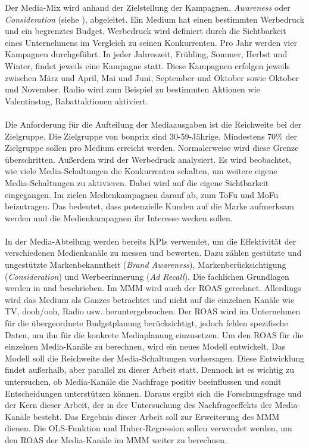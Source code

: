 Der Media-Mix wird anhand der Zielstellung der Kampagnen, \textit{Awareness} oder \textit{Consideration} (siehe ), abgeleitet. Ein Medium hat einen bestimmten Werbedruck und ein begrenztes Budget. Werbedruck wird definiert durch die Sichtbarkeit eines Unternehmens im Vergleich zu seinen Konkurrenten. Pro Jahr werden vier Kampagnen durchgeführt. In jeder Jahreszeit, Frühling, Sommer, Herbst und Winter, findet jeweils eine Kampagne statt. Diese Kampagnen erfolgen jeweils zwischen März und April, Mai und Juni, September und Oktober sowie Oktober und November. Radio wird zum Beispiel zu bestimmten Aktionen wie Valentinstag, Rabattaktionen aktiviert.\\\\
Die Anforderung für die Aufteilung der Mediaausgaben ist die Reichweite bei der Zielgruppe. Die Zielgruppe von bonprix sind 30-59-Jährige. Mindestens 70\% der Zielgruppe sollen pro Medium erreicht werden. Normalerweise wird diese Grenze überschritten. Außerdem wird der Werbedruck analysiert. Es wird beobachtet, wie viele Media-Schaltungen die Konkurrenten schalten, um weitere eigene Media-Schaltungen zu aktivieren. Dabei wird auf die eigene Sichtbarkeit eingegangen. Im  zielen Medienkampagnen darauf ab, zum \ac{ToFu} und \ac{MoFu} beizutragen. Das bedeutet, dass potenzielle Kunden auf die Marke aufmerksam werden und die Medienkampagnen ihr Interesse wecken sollen. \\\\
In der Media-Abteilung werden bereits \ac{KPI}s verwendet, um die Effektivität der verschiedenen Medienkanäle zu messen und bewerten. Dazu zählen gestützte und ungestützte Markenbekanntheit (\textit{Brand Awareness}), Markenberücksichtigung (\textit{Consideration}) und Werbeerinnerung (\textit{Ad Recall}). Die fachlichen Grundlagen werden in  und  beschrieben. Im \ac{MMM} wird auch der \ac{ROAS} gerechnet. Allerdings wird das Medium als Ganzes betrachtet und nicht auf die einzelnen Kanäle wie TV, \ac{dooh}/\ac{ooh}, Radio usw. heruntergebrochen. Der \ac{ROAS} wird im Unternehmen für die übergeordnete Budgetplanung berücksichtigt, jedoch fehlen spezifische Daten, um ihn für die konkrete Mediaplanung einzusetzen. Um den \ac{ROAS} für die einzelnen Media-Kanäle zu berechnen, wird ein neues Modell entwickelt. Das Modell soll die Reichweite der Media-Schaltungen vorhersagen. Diese Entwicklung findet außerhalb, aber parallel zu dieser Arbeit statt. Dennoch ist es wichtig zu untersuchen, ob Media-Kanäle die Nachfrage positiv beeinflussen und somit Entscheidungen unterstützen können. Daraus ergibt sich die Forschungsfrage und der Kern dieser Arbeit, der in der Untersuchung des Nachfrageeffekts der Media-Kanäle besteht. Das Ergebnis dieser Arbeit soll zur Erweiterung des \ac{MMM} dienen. Die \ac{OLS}-Funktion und Huber-Regression sollen verwendet werden, um den \ac{ROAS} der Media-Kanäle im \ac{MMM} weiter zu berechnen. \\\\
